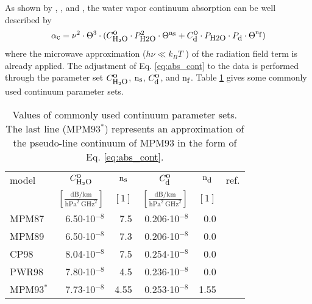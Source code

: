 \label{leveld:h2o_Cont}
As shown by \cite{liebeandlayton:87}, \cite{pwr:98}, and \cite{ma:90},
the water vapor continuum absorption can be well described by 
\begin{equation} 
  \label{eq:abs_cont}
  \alpha_{\mbox{\small c}} = \nu^2 \cdot \Theta^{3} \cdot 
            (C^{\mbox{\rm o}}_{\mbox{\rm \small H}_{2}\mbox{\rm \small O}} \cdot P_{\mbox{\rm \small H2O}}^2 \cdot \Theta^{{\rm n}_{\mbox{\rm \small s}}} + 
             C^{\mbox{\rm o}}_{\mbox{\rm \small d}} \cdot P_{\mbox{\rm \small H2O}} \cdot P_{\mbox{\rm \small d}} \cdot \Theta^{{\rm n}_{\mbox{\rm \small f}}})
\end{equation}
where the microwave approximation ($h\nu\ll k_BT$ ) of the radiation field term 
is already applied. The adjustment of Eq. \ref{eq:abs_cont} to the data 
is performed through the parameter set $C^{\mbox{\rm o}}_{\mbox{\rm \small H}_{2}\mbox{\rm \small O}}$, ${\rm n}_{\mbox{\rm \small s}}$, $C^{\mbox{\rm o}}_{\mbox{\rm \small d}}$, and ${\rm n}_{\mbox{\rm \small f}}$. 
Table \ref{tab:wvcontparam} gives some commonly used continuum parameter sets.
\begin{table}[!hbt]
  \begin{center}
  \begin{tabular}{lrrrrr}
    \hline
    model  & \multicolumn{1}{c}{$C^{\mbox{\rm o}}_{\mbox{\rm \small H}_{2}\mbox{\rm \small O}}$} & 
             \multicolumn{1}{c}{${\rm n}_{\mbox{\rm \small s}}$}  & 
             \multicolumn{1}{c}{$C^{\mbox{\rm o}}_{\mbox{\rm \small d}}$} & 
             \multicolumn{1}{c}{${\rm n}_{\mbox{\rm \small d}}$}  & 
             ref.\\
           & \multicolumn{1}{c}{$\left[\frac{\mbox{dB/km}}
                               {\mbox{hPa}^2~\mbox{GHz}^2}\right]$} & 
             \multicolumn{1}{c}{$[1]$} & 
             \multicolumn{1}{c}{$\left[\frac{\mbox{dB/km}}
                               {\mbox{hPa}^2~\mbox{GHz}^2}\right]$} & 
             \multicolumn{1}{c}{$[1]$} & \\
    \hline
    MPM87  & 6.50$\cdot$10$^{-8}$ & 7.5 & 0.206$\cdot$10$^{-8}$  &  0.0 & \cite{liebeandlayton:87}\\
    MPM89  & 6.50$\cdot$10$^{-8}$ & 7.3 & 0.206$\cdot$10$^{-8}$  &  0.0 & \cite{liebe:89}\\
    CP98   & 8.04$\cdot$10$^{-8}$ & 7.5 & 0.254$\cdot$10$^{-8}$  &  0.0 & \cite{cruzpol:98}\\ 
    PWR98  & 7.80$\cdot$10$^{-8}$ & 4.5 & 0.236$\cdot$10$^{-8}$  &  0.0 & \cite{pwr:98}\\
    \hline
    MPM93$^*$ & 7.73$\cdot$10$^{-8}$ & 4.55 & 0.253$\cdot$10$^{-8}$  & 1.55 & \cite{liebeetal:93}\\
    \hline
 \end{tabular}
\end{center}
 \caption{Values of commonly used continuum parameter sets. The last line (MPM93$^*$)
   represents an approximation of the pseudo-line continuum of MPM93
   in the form of Eq. \ref{eq:abs_cont}.}
 \label{tab:wvcontparam}
\end{table}

